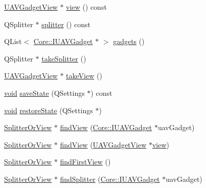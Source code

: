\begin{DoxyCompactItemize}
\item 
\hyperlink{class_core_1_1_internal_1_1_u_a_v_gadget_view}{\-U\-A\-V\-Gadget\-View} $\ast$ \hyperlink{group___core_plugin_ga885a960ed8f9cdcfa3e01e739743f93d}{view} () const 
\item 
\-Q\-Splitter $\ast$ \hyperlink{group___core_plugin_gaa4c325c0a3087b708b0fb00ba36a8646}{splitter} () const 
\item 
\-Q\-List$<$ \hyperlink{class_core_1_1_i_u_a_v_gadget}{\-Core\-::\-I\-U\-A\-V\-Gadget} $\ast$ $>$ \hyperlink{group___core_plugin_gaf764d23e51e392c911d26816423a67ac}{gadgets} ()
\item 
\-Q\-Splitter $\ast$ \hyperlink{group___core_plugin_ga752524f83f9d68f2eaa404fe060498c3}{take\-Splitter} ()
\item 
\hyperlink{class_core_1_1_internal_1_1_u_a_v_gadget_view}{\-U\-A\-V\-Gadget\-View} $\ast$ \hyperlink{group___core_plugin_ga21d8dac3ce456267bbd7a220637a7e49}{take\-View} ()
\item 
\hyperlink{group___u_a_v_objects_plugin_ga444cf2ff3f0ecbe028adce838d373f5c}{void} \hyperlink{group___core_plugin_ga388c7d30aa5e75b3ec771e66566eb5f1}{save\-State} (\-Q\-Settings $\ast$) const 
\item 
\hyperlink{group___u_a_v_objects_plugin_ga444cf2ff3f0ecbe028adce838d373f5c}{void} \hyperlink{group___core_plugin_ga9ab64d930eee17a2e95b851689b08336}{restore\-State} (\-Q\-Settings $\ast$)
\item 
\hyperlink{class_core_1_1_internal_1_1_splitter_or_view}{\-Splitter\-Or\-View} $\ast$ \hyperlink{group___core_plugin_ga52a86e796c14405fa7b471c1d9bfae40}{find\-View} (\hyperlink{class_core_1_1_i_u_a_v_gadget}{\-Core\-::\-I\-U\-A\-V\-Gadget} $\ast$uav\-Gadget)
\item 
\hyperlink{class_core_1_1_internal_1_1_splitter_or_view}{\-Splitter\-Or\-View} $\ast$ \hyperlink{group___core_plugin_ga924d2e411dff3c084aa3d19454905274}{find\-View} (\hyperlink{class_core_1_1_internal_1_1_u_a_v_gadget_view}{\-U\-A\-V\-Gadget\-View} $\ast$\hyperlink{group___core_plugin_ga885a960ed8f9cdcfa3e01e739743f93d}{view})
\item 
\hyperlink{class_core_1_1_internal_1_1_splitter_or_view}{\-Splitter\-Or\-View} $\ast$ \hyperlink{group___core_plugin_ga9527e06232dae22e08f41dd4644a4157}{find\-First\-View} ()
\item 
\hyperlink{class_core_1_1_internal_1_1_splitter_or_view}{\-Splitter\-Or\-View} $\ast$ \hyperlink{group___core_plugin_ga9f0ee5b870e11e9a8830c4a9574d6ef0}{find\-Splitter} (\hyperlink{class_core_1_1_i_u_a_v_gadget}{\-Core\-::\-I\-U\-A\-V\-Gadget} $\ast$uav\-Gadget)

\end{DoxyCompactItemize}
